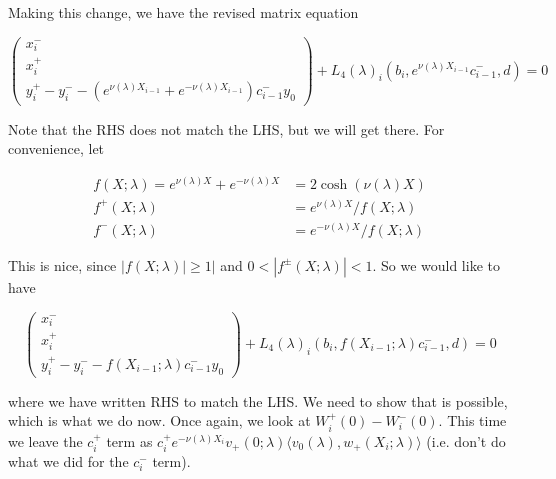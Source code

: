 \documentclass[12pt]{article}
\begin{document}
\begin{enumerate}
Making this change, we have the revised matrix equation

\[
\begin{pmatrix}x_i^- \\ x_i^+ \\ y_i^+ - y_i^- - (e^{\nu(\lambda)X_{i-1}} + e^{-\nu(\lambda)X_{i-1}})c_{i-1}^- y_0 \end{pmatrix} + L_4(\lambda)_i(b_i, e^{\nu(\lambda)X_{i-1}} c_{i-1}^-, d) = 0
\]

Note that the RHS does not match the LHS, but we will get there. For convenience, let

\begin{align*}
f(X; \lambda) = e^{\nu(\lambda)X} + e^{-\nu(\lambda)X} &= 2 \cosh (\nu(\lambda) X) \\
f^+(X; \lambda) &= e^{\nu(\lambda)X} / f(X; \lambda) \\
f^-(X; \lambda) &= e^{-\nu(\lambda)X} / f(X; \lambda)
\end{align*}

This is nice, since $|f(X; \lambda)| \geq 1|$ and $0 < |f^\pm(X; \lambda)| < 1$. So we would like to have

\[
\begin{pmatrix}x_i^- \\ x_i^+ \\ y_i^+ - y_i^- - f(X_{i-1}; \lambda)c_{i-1}^- y_0 \end{pmatrix} + L_4(\lambda)_i(b_i, f(X_{i-1}; \lambda) c_{i-1}^-, d) = 0
\]

where we have written RHS to match the LHS. We need to show that is possible, which is what we do now. Once again, we look at $W_i^+(0) - W_i^-(0)$. This time we leave the $c_i^+$ term as $c_i^+ e^{-\nu(\lambda)X_i} v_+(0; \lambda) \langle v_0(\lambda), w_+(X_i; \lambda) \rangle$ (i.e. don't do what we did for the $c_i^-$ term).


\end{enumerate}
\end{document}
